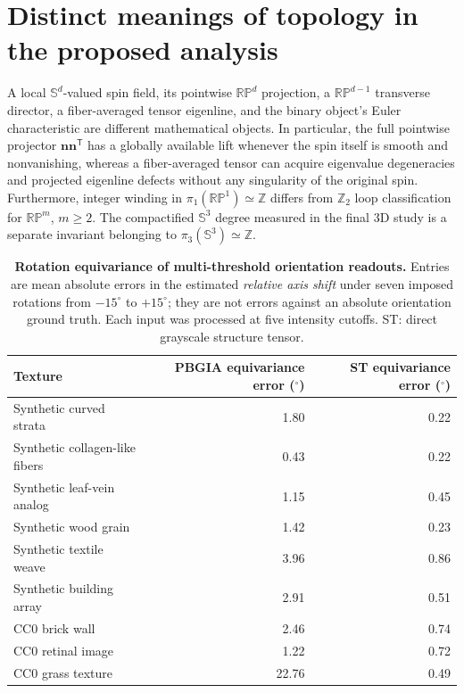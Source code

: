 \documentclass[11pt,a4paper]{article}
\newcommand{\nn}{\bm n}
\newcommand{\bbZ}{\mathbb Z}
\newcommand{\RP}{\mathbb{RP}}
\newcommand{\Sn}{\mathbb S}
\begin{document}
\section{Distinct meanings of topology in the proposed analysis}\label{app:topology}
A local \(\Sn^d\)-valued spin field, its pointwise \(\RP^d\) projection, a \(\RP^{d-1}\) transverse director, a fiber-averaged tensor eigenline, and the binary object's Euler characteristic are different mathematical objects. In particular, the full pointwise projector \(\nn\nn^{\mathsf T}\) has a globally available lift whenever the spin itself is smooth and nonvanishing, whereas a fiber-averaged tensor can acquire eigenvalue degeneracies and projected eigenline defects without any singularity of the original spin. Furthermore, integer winding in \(\pi_1(\RP^1)\simeq\bbZ\) differs from \(\bbZ_2\) loop classification for \(\RP^m\), \(m\ge2\). The compactified \(\Sn^3\) degree measured in the final 3D study is a separate invariant belonging to \(\pi_3(\Sn^3)\simeq\bbZ\).

\begin{table}[p]
\centering\caption{\textbf{Rotation equivariance of multi-threshold orientation readouts.} Entries are mean absolute errors in the estimated \emph{relative axis shift} under seven imposed rotations from $-15^\circ$ to $+15^\circ$; they are not errors against an absolute orientation ground truth. Each input was processed at five intensity cutoffs. ST: direct grayscale structure tensor.}
\small\begin{tabular}{@{}lrr@{}}\toprule
Texture & PBGIA equivariance error ($^\circ$) & ST equivariance error ($^\circ$)\\\midrule
Synthetic curved strata & 1.80 & 0.22\\
Synthetic collagen-like fibers & 0.43 & 0.22\\
Synthetic leaf-vein analog & 1.15 & 0.45\\
Synthetic wood grain & 1.42 & 0.23\\
Synthetic textile weave & 3.96 & 0.86\\
Synthetic building array & 2.91 & 0.51\\
CC0 brick wall & 2.46 & 0.74\\
CC0 retinal image & 1.22 & 0.72\\
CC0 grass texture & 22.76 & 0.49\\\bottomrule
\end{tabular}
\label{tab:multithresh}
\end{table}



\end{document}
